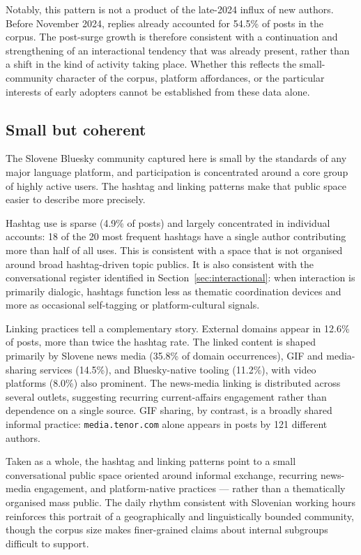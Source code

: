 Notably, this pattern is not a product of the late-2024 influx of new authors. Before November 2024, replies already accounted for 54.5\% of posts in the corpus. The post-surge growth is therefore consistent with a continuation and strengthening of an interactional tendency that was already present, rather than a shift in the kind of activity taking place. Whether this reflects the small-community character of the corpus, platform affordances, or the particular interests of early adopters cannot be established from these data alone.

\subsection{Small but coherent}

The Slovene Bluesky community captured here is small by the standards of any major language platform, and participation is concentrated around a core group of highly active users. The hashtag and linking patterns make that public space easier to describe more precisely.

Hashtag use is sparse (4.9\% of posts) and largely concentrated in individual accounts: 18 of the 20 most frequent hashtags have a single author contributing more than half of all uses. This is consistent with a space that is not organised around broad hashtag-driven topic publics. It is also consistent with the conversational register identified in Section~\ref{sec:interactional}: when interaction is primarily dialogic, hashtags function less as thematic coordination devices and more as occasional self-tagging or platform-cultural signals.

Linking practices tell a complementary story. External domains appear in 12.6\% of posts, more than twice the hashtag rate. The linked content is shaped primarily by Slovene news media (35.8\% of domain occurrences), GIF and media-sharing services (14.5\%), and Bluesky-native tooling (11.2\%), with video platforms (8.0\%) also prominent. The news-media linking is distributed across several outlets, suggesting recurring current-affairs engagement rather than dependence on a single source. GIF sharing, by contrast, is a broadly shared informal practice: \texttt{media.tenor.com} alone appears in posts by 121 different authors.

Taken as a whole, the hashtag and linking patterns point to a small conversational public space oriented around informal exchange, recurring news-media engagement, and platform-native practices --- rather than a thematically organised mass public. The daily rhythm consistent with Slovenian working hours reinforces this portrait of a geographically and linguistically bounded community, though the corpus size makes finer-grained claims about internal subgroups difficult to support.

